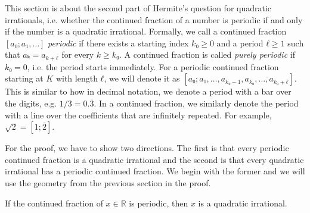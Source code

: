 This section is about the second part of Hermite's question for quadratic
irrationals, i.e. whether the continued fraction of a number is periodic if and only
if the number is a quadratic irrational.
Formally, we call a continued fraction $[a₀; a₁, …]$ \emph{periodic}
if there exists a starting index $k₀ ≥ 0$ and a period $ℓ ≥ 1$ such that $aₖ = a_{k+ℓ}$ for every $k ≥ k₀$.
A continued fraction is called \emph{purely periodic} if $k₀ = 0$,
i.e. the period starts immediately.
For a periodic continued fraction starting at $K$ with length $ℓ$,
we will denote it as $[a₀; a₁, …, a_{k₀-1}, \overline{a_{k₀}, …, a_{k₀+ℓ}}]$.
This is similar to how in decimal notation, we denote a period with a bar over the digits,
e.g. $1/3 = 0.\overline{3}$.
In a continued fraction, we similarly denote the period with a line over the
coefficients that are infinitely repeated.
For example, $\sqrt{2} = [1; \overline{2}]$.

For the proof, we have to show two directions.
The first is that every periodic continued fraction is a quadratic irrational
and the second is that every quadratic irrational has a periodic continued fraction.
We begin with the former and we will use the geometry from the previous section
in the proof.

\begin{theorem}
  If the continued fraction of $x ∈ ℝ$ is periodic, then $x$ is a quadratic irrational.
\end{theorem}

